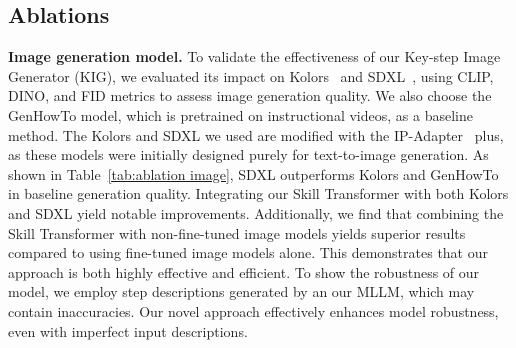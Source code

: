 \subsection{Ablations}

\begin{table}[t]
\centering
{}
\caption{Ablations on image generation models. Since Kolors and SDXL were originally designed for text-to-image generation, we use the IP-Adapter to inject the initial image as an image condition into both models. ``ft.” denotes the image model is fine-tuned, while ``+ST.” indicates that image features are passed through our trained Skill Transformer before being injected into the image model. The default choice is colored in \colorbox[rgb]{0.9,0.9,0.9}{gray}.}
\label{tab:ablation image}
\end{table}

\textbf{Image generation model.} To validate the effectiveness of our Key-step Image Generator (KIG), we evaluated its impact on Kolors~\cite{kolors} and SDXL~\cite{sdxl}, using CLIP, DINO, and FID metrics to assess image generation quality. We also choose the GenHowTo model, which is pretrained on instructional videos, as a baseline method. The Kolors and SDXL we used are modified with the IP-Adapter~\cite{ip} plus, as these models were initially designed purely for text-to-image generation. As shown in Table~\ref{tab:ablation image}, SDXL outperforms Kolors and GenHowTo in baseline generation quality. Integrating our Skill Transformer with both Kolors and SDXL yield notable improvements. Additionally, we find that combining the Skill Transformer with non-fine-tuned image models yields superior results compared to using fine-tuned image models alone. This demonstrates that our approach is both highly effective and efficient. To show the robustness of our model, we employ step descriptions generated by an our MLLM, which may contain inaccuracies. Our novel approach effectively enhances model robustness, even with imperfect input descriptions.

